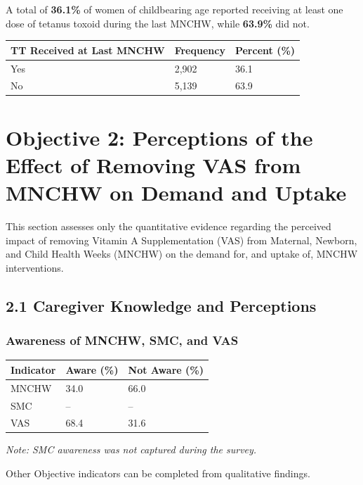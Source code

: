 \documentclass[
  11pt,
]{report}
\begin{document}
A total of \textbf{36.1\%} of women of childbearing age reported
receiving at least one dose of tetanus toxoid during the last MNCHW,
while \textbf{63.9\%} did not.

\begin{longtable}[]{@{}lll@{}}
\toprule\noalign{}
TT Received at Last MNCHW & Frequency & Percent (\%) \\
\midrule\noalign{}
\endhead
\bottomrule\noalign{}
\endlastfoot
Yes & 2,902 & 36.1 \\
No & 5,139 & 63.9 \\
\end{longtable}

\chapter{Objective 2: Perceptions of the Effect of Removing VAS from
MNCHW on Demand and
Uptake}\label{objective-2-perceptions-of-the-effect-of-removing-vas-from-mnchw-on-demand-and-uptake}

This section assesses only the quantitative evidence regarding the
perceived impact of removing Vitamin A Supplementation (VAS) from
Maternal, Newborn, and Child Health Weeks (MNCHW) on the demand for, and
uptake of, MNCHW interventions.

\section{2.1 Caregiver Knowledge and
Perceptions}\label{caregiver-knowledge-and-perceptions}

\subsection{Awareness of MNCHW, SMC, and
VAS}\label{awareness-of-mnchw-smc-and-vas}

\begin{longtable}[]{@{}lll@{}}
\toprule\noalign{}
Indicator & Aware (\%) & Not Aware (\%) \\
\midrule\noalign{}
\endhead
\bottomrule\noalign{}
\endlastfoot
MNCHW & 34.0 & 66.0 \\
SMC & -- & -- \\
VAS & 68.4 & 31.6 \\
\end{longtable}

\emph{Note: SMC awareness was not captured during the survey.}

Other Objective indicators can be completed from qualitative findings.
\end{document}
